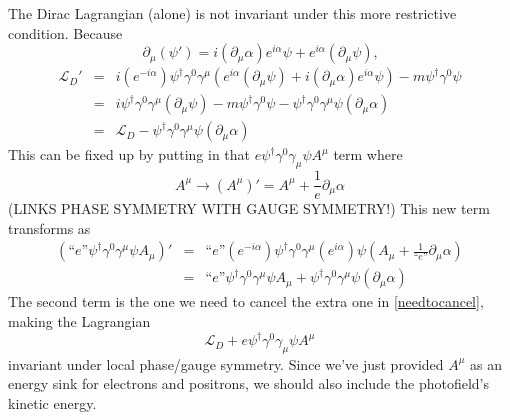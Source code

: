 \documentclass[12pt]{article}
\begin{document}
The Dirac Lagrangian (alone) is not invariant under this more
restrictive condition.  Because
\begin{equation}
  \partial_\mu (\psi') = i(\partial_\mu \alpha) e^{i\alpha} \psi + e^{i\alpha} (\partial_\mu \psi) \mbox{,}
\end{equation}
\begin{eqnarray}
  \mathcal{L}_D' &=& i(e^{-i\alpha})\psi^\dagger \gamma^0 \gamma^\mu
  \left(e^{i\alpha} (\partial_\mu \psi) + i (\partial_\mu \alpha) e^{i\alpha} \psi \right) - m \psi^\dagger \gamma^0 \psi \\
  &=& i \psi^\dagger \gamma^0 \gamma^\mu (\partial_\mu \psi) - m \psi^\dagger \gamma^0 \psi -
  \psi^\dagger \gamma^0 \gamma^\mu \psi (\partial_\mu \alpha) \\
  &=& \mathcal{L}_D -   \psi^\dagger \gamma^0 \gamma^\mu \psi (\partial_\mu \alpha) \label{needtocancel}
\end{eqnarray}
This can be fixed up by putting in that $e \psi^\dagger \gamma^0
\gamma_\mu \psi A^\mu$ term where
\begin{equation}
  A^\mu \to (A^\mu)' = A^\mu + \frac{1}{e}\partial_\mu \alpha \label{gaugesymmetryofa}
\end{equation}
(LINKS PHASE SYMMETRY WITH GAUGE SYMMETRY!)  This new term
transforms as
\begin{eqnarray}
  (\mbox{``}e\mbox{''} \psi^\dagger \gamma^0 \gamma^\mu \psi A_\mu)' &=&
  \mbox{``}e\mbox{''} (e^{-i\alpha}) \psi^\dagger \gamma^0 \gamma^\mu (e^{i\alpha}) \psi
  (A_\mu + \frac{1}{\mbox{``}e\mbox{''}} \partial_\mu \alpha ) \\
  &=& \mbox{``}e\mbox{''} \psi^\dagger \gamma^0 \gamma^\mu \psi A_\mu + \psi^\dagger \gamma^0 \gamma^\mu \psi (\partial_\mu \alpha)
\end{eqnarray}
The second term is the one we need to cancel the extra one in
\ref{needtocancel}, making the Lagrangian
\begin{equation}
  \mathcal{L}_D + e \psi^\dagger \gamma^0 \gamma_\mu \psi A^\mu
\end{equation}
invariant under local phase/gauge symmetry.  Since we've just provided
$A^\mu$ as an energy sink for electrons and positrons, we should also
include the photofield's kinetic energy.
\begin{center}
\end{center}
\end{document}
